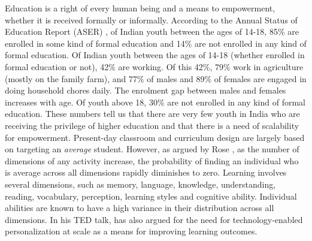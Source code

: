 \begin{multicols}{2}
Education is a right of every human being and a means to empowerment, whether it is received formally or informally. According to the Annual Status of Education Report (ASER) \cite{art2-key01}, of Indian youth between the ages of 14-18, 85\% are enrolled in some kind of formal education and 14\% are not enrolled in any kind of formal education. Of Indian youth between the ages of 14-18 (whether enrolled in formal education or not), 42\% are working. Of this 42\%, 79\% work in agriculture (mostly on the family farm), and 77\% of males and 89\% of females are engaged in doing household chores daily. The enrolment gap between males and females increases with age. Of youth above 18, 30\% are not enrolled in any kind of formal education. These numbers tell us that there are very few youth in India who are receiving the privilege of higher education and that there is a need of scalability for empowerment. Present-day classroom and curriculum design are largely based on targeting an \textit{average} student. However, as argued by Rose \cite{art2-key43}, as the number of dimensions of any activity increase, the probability of finding an individual who is average across all dimensions rapidly diminishes to zero. Learning involves several dimensions, such as memory, language, knowledge, understanding, reading, vocabulary, perception, learning styles \cite{art2-key15} and cognitive ability. Individual abilities are known to have a high variance in their distribution across all dimensions. In his TED talk, \cite{art2-key42} has also argued for the need for technology-enabled personalization at scale as a means for improving learning outcomes. 


\end{multicols}
